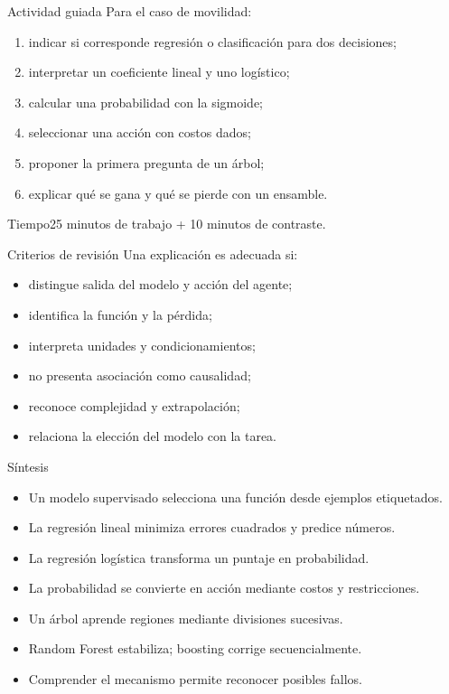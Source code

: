 \documentclass[aspectratio=169,10pt]{beamer}
\begin{document}
\begin{frame}{Actividad guiada}
  \footnotesize Para el caso de movilidad:
  \begin{enumerate}
    \item indicar si corresponde regresión o clasificación para dos decisiones;
    \item interpretar un coeficiente lineal y uno logístico;
    \item calcular una probabilidad con la sigmoide;
    \item seleccionar una acción con costos dados;
    \item proponer la primera pregunta de un árbol;
    \item explicar qué se gana y qué se pierde con un ensamble.
  \end{enumerate}
  \begin{block}{Tiempo}25 minutos de trabajo + 10 minutos de contraste.\end{block}
\end{frame}

\begin{frame}{Criterios de revisión}
  \small Una explicación es adecuada si:
  \begin{itemize}
    \item distingue salida del modelo y acción del agente;
    \item identifica la función y la pérdida;
    \item interpreta unidades y condicionamientos;
    \item no presenta asociación como causalidad;
    \item reconoce complejidad y extrapolación;
    \item relaciona la elección del modelo con la tarea.
  \end{itemize}
\end{frame}

\begin{frame}{Síntesis}
  \footnotesize
  \begin{itemize}
    \item Un modelo supervisado selecciona una función desde ejemplos etiquetados.
    \item La regresión lineal minimiza errores cuadrados y predice números.
    \item La regresión logística transforma un puntaje en probabilidad.
    \item La probabilidad se convierte en acción mediante costos y restricciones.
    \item Un árbol aprende regiones mediante divisiones sucesivas.
    \item Random Forest estabiliza; boosting corrige secuencialmente.
    \item Comprender el mecanismo permite reconocer posibles fallos.
  \end{itemize}
\end{frame}
\end{document}
